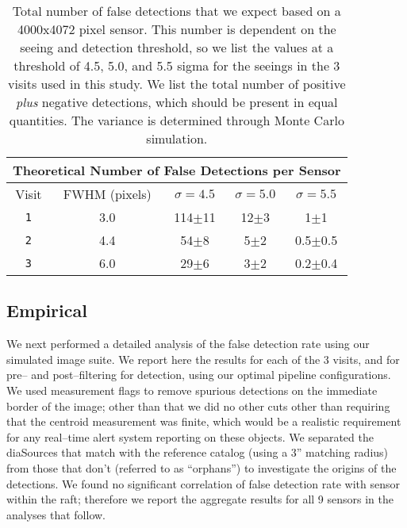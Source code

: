\documentclass[iop]{emulateapj}
\begin{document}
\begin{table*}[t]
\centering
\begin{tabular}{ccccc}
\hline
\multicolumn{5}{|c|}{Theoretical Number of False Detections per Sensor} \\
\hline
Visit    & FWHM (pixels) & $\sigma=4.5$ & $\sigma=5.0$ & $\sigma=5.5$\\
\hline
{\tt 1} & 3.0 & 114$\pm$11 & 12$\pm$3& 1$\pm$1\\
{\tt 2} & 4.4 & 54$\pm$8 & 5$\pm$2& 0.5$\pm$0.5\\
{\tt 3} & 6.0 & 29$\pm$6 & 3$\pm$2&0.2$\pm$0.4\\
\end{tabular}
\caption{{\rm Total number of false detections that we expect based on a 4000x4072 pixel sensor.
    This number is dependent on the seeing and detection threshold, so we list the values at a threshold of 4.5, 5.0, and 5.5 sigma for the seeings in the 3 visits used in this study.
    We list the total number of positive {\it plus} negative detections, which should be present in equal quantities.
    The variance is determined through Monte Carlo simulation.\label{tab-fp}}}
\end{table*}

\subsection{Empirical}

We next performed a detailed analysis of the false detection rate using our simulated image suite.
We report here the results for each of the 3 visits, and for pre-- and post--filtering for detection, using our optimal pipeline configurations.
We used measurement flags to remove spurious detections on the immediate border of the image; other than that we did no other cuts other than requiring that the centroid measurement was finite, which would be a realistic requirement for any real--time alert system reporting on these objects.
We separated the diaSources that match with the reference catalog (using a 3'' matching radius) from those that don't (referred to as ``orphans'') to investigate the origins of the detections.
We found no significant correlation of false detection rate with sensor within the raft; therefore we report the aggregate results for all 9 sensors in the analyses that follow.
\end{document}
